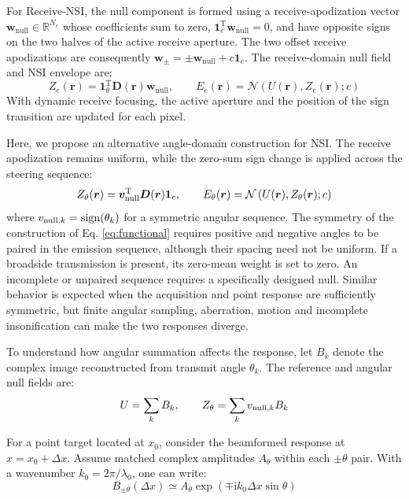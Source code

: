 \documentclass{iopjournal}
\newcommand{\ones}{\bm{1}}
\newcommand{\Dmat}{\bm{D}}
\newcommand{\rvec}{\bm{r}}
\providecommand{\revstart}{}
\providecommand{\revstop}{}
\begin{document}
For \revstart Receive-NSI\revstop, the null component is formed using a
receive-apodization vector $\bm{w}_{\mathrm{null}}\in\mathbb{R}^{N_e}$ whose
coefficients sum to zero, $\ones_e^{\mathrm T}\bm{w}_{\mathrm{null}}=0$, and
have opposite signs on the two halves of the active receive aperture. The two
offset receive apodizations are consequently
$\bm{w}_{\pm}=\pm\bm{w}_{\mathrm{null}}+c\ones_e$. The receive-domain null field
and NSI envelope are:
\begin{equation}
Z_e(\rvec)=\ones_\theta^{\mathrm T}\Dmat(\rvec)\bm{w}_{\mathrm{null}},
\qquad E_e(\rvec)=\mathcal{N}\left(U(\rvec),Z_e(\rvec);c\right)
\label{eq:receive}
\end{equation}
With dynamic receive focusing, the active aperture and the position of the sign
transition are updated for each pixel.

Here, we propose an alternative angle-domain construction for NSI. The receive
apodization remains uniform, while the zero-sum sign change is applied across
the steering sequence:
\begin{equation}
Z_{\theta}(\rvec)=\bm{v}_{\rm null}^{\mathrm T}\Dmat(\rvec)\ones_e,
\qquad E_\theta(\rvec)=\mathcal{N}\left(U(\rvec),Z_\theta(\rvec);c\right)
\label{eq:angle}
\end{equation}
where $v_{{\rm null},k}=\operatorname{sign}(\theta_k)$ for a symmetric angular
sequence. \revstart The symmetry of the construction of Eq. \eqref{eq:functional} requires positive and negative angles to be paired in the emission sequence, although their
spacing need not be uniform.\revstop{} If a broadside transmission is present, its zero-mean weight is set to zero. \revstart An incomplete or unpaired sequence requires a
specifically designed null. \revstop Similar behavior is expected when the acquisition
and point response are sufficiently symmetric, but finite angular sampling,
aberration, motion and incomplete insonification can make the two responses
diverge. 

\revstart To understand how angular summation affects the response, let \(B_k\) denote the complex image reconstructed from transmit angle \(\theta_k\). The reference and angular null fields are:
\begin{equation}
U=\sum_k B_k,\qquad Z_\theta=\sum_k v_{{\rm null},k}B_k
\label{eq:fields-model}
\end{equation}

For a point target located at \(x_0\), consider the beamformed response at \(x=x_0+\Delta x\). Assume matched complex amplitudes \(A_\theta\) within each \(\pm\theta\) pair. With a wavenumber $k_0=2\pi/\lambda_0$, one can write:
\begin{equation}
B_{\pm\theta}(\Delta x)\simeq
A_\theta\exp(\mp\mathrm{i}k_0\Delta x\sin\theta)
\label{eq:paired-angle-model}
\end{equation}
\end{document}
